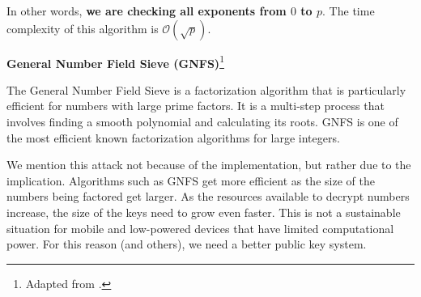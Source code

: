 \documentclass{article}
\begin{document}
    In other words, \textbf{we are checking all exponents from $0$ to $p$}. The time complexity of this algorithm is $\mathcal{O}(\sqrt{p})$.

    \pagebreak
    
    \begin{center}
    \textbf{General Number Field Sieve (GNFS)}\footnote{Adapted from \cite{cloudflare_blog}.}
    \end{center}
    
    The General Number Field Sieve is a factorization algorithm that is particularly efficient for numbers with large prime factors. It is a multi-step process that involves finding a smooth polynomial and calculating its roots. GNFS is one of the most efficient known factorization algorithms for large integers.
    
    \vspace{3mm}
    We mention this attack not because of the implementation, but rather due to the implication. Algorithms such as GNFS get more efficient as the size of the numbers being factored get larger. As the resources available to decrypt numbers increase, the size of the keys need to grow even faster. This is not a sustainable situation for mobile and low-powered devices that have limited computational power. For this reason (and others), we need a better public key system. 
\end{document}
